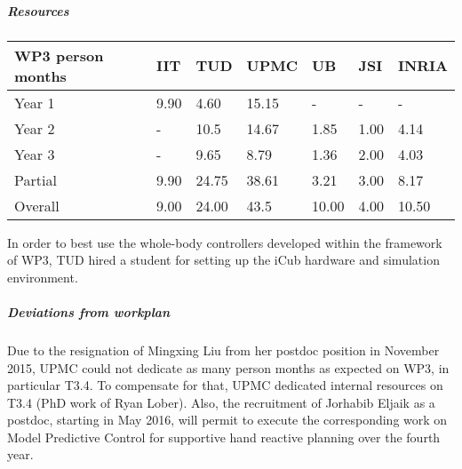 
\subparagraph*{Resources}

\begin{center}
\begin{tabular}{|C{1.5cm}|C{1.5cm}|C{1.5cm}|C{2cm}|C{2cm}|C{2cm}|C{2cm}|}
\hline
\footnotesize \textbf{WP3 person months} & \footnotesize \textbf{IIT}&\footnotesize \textbf{TUD}&\footnotesize \textbf{UPMC}& \footnotesize \textbf{UB} &\footnotesize \textbf{JSI} &\footnotesize \textbf{INRIA} \\ \hline
\footnotesize Year 1 &  9.90 & 4.60 & 15.15 & - & - &  -   \\  \hline
\footnotesize Year 2 &  - & 10.5 & 14.67 & 1.85 & 1.00 &  4.14  \\  \hline
\footnotesize Year 3 &  - & 9.65 & 8.79 & 1.36 & 2.00 & 4.03 \\  \hline
\footnotesize Partial &  9.90 & 24.75 & 38.61 & 3.21 & 3.00 & 8.17 \\ 
\hline \hline
\footnotesize Overall &  9.00 & 24.00 & 43.5 & 10.00 & 4.00 & 10.50 \\ \hline
\end{tabular}
\end{center}

In order to best use the whole-body controllers developed within the framework of WP3, TUD hired a student for setting up the iCub hardware and simulation environment.

\subparagraph*{Deviations from workplan}

Due to the resignation of Mingxing Liu from her postdoc position in November 2015, UPMC could not dedicate as many person months as expected on WP3, in particular T3.4. To compensate for that, UPMC dedicated internal resources on T3.4 (PhD work of Ryan Lober). Also, the recruitment of Jorhabib Eljaik as a postdoc, starting in May 2016, will permit to execute the corresponding work on Model Predictive Control for supportive hand reactive planning over the fourth year. 



